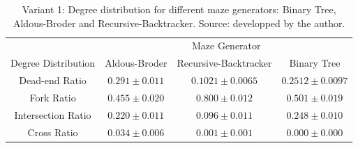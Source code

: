 \begin{table}[!h]
    \begin{center} 
        \caption{Variant 1: Degree distribution for different maze generators: Binary Tree, Aldous-Broder and Recursive-Backtracker. Source: developped by the author.} 
    \begin{tabular}{ c c c c} \hline
    ~&\multicolumn{3}{c}{Maze Generator} \\
Degree Distribution&Aldous-Broder&Recursive-Backtracker&Binary Tree\\
    \hline \hline 
Dead-end Ratio&$0.291\pm 0.011$&$0.1021\pm 0.0065$&$0.2512\pm 0.0097$\\    
    \hline
Fork Ratio&$0.455\pm 0.020$&$0.800\pm 0.012$&$0.501\pm 0.019$\\
    \hline
Intersection Ratio&$0.220\pm 0.011$&$0.096\pm 0.011$&$0.248\pm 0.010$\\    
    \hline
Cross Ratio&$0.034\pm 0.006$&$0.001\pm 0.001$&$0.000\pm 0.000$\\    
    \hline   
     \end{tabular} 
    \end{center}
     \end{table}

